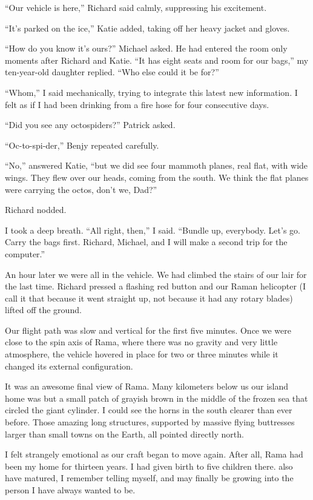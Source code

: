 \documentclass[]{article}
\begin{document}
{“Our vehicle is here,” Richard said calmly, suppressing his excitement.

“It’s parked on the ice,” Katie added, taking off her heavy jacket and gloves.

“How do you know it’s ours?” Michael asked.  He had entered the room only moments after Richard and Katie.  “It has eight seats and room for our bags,” my ten-year-old daughter replied.  “Who else could it be for?”

“Whom,” I said mechanically, trying to integrate this latest new information.  I felt as if I had been drinking from a fire hose for four consecutive days.

“Did you see any octospiders?” Patrick asked.

“Oc-to-spi-der,” Benjy repeated carefully.

“No,” answered Katie, “but we did see four mammoth planes, real flat, with wide wings.  They flew over our heads, coming from the south.  We think the flat planes were carrying the octos, don’t we, Dad?”

Richard nodded.

I took a deep breath.  “All right, then,” I said.  “Bundle up, everybody.  Let’s go.  Carry the bags first.  Richard, Michael, and I will make a second trip for the computer.”

An hour later we were all in the vehicle.  We had climbed the stairs of our lair for the last time.  Richard pressed a flashing red button and our Raman helicopter (I call it that because it went straight up, not because it had any rotary blades) lifted off the ground.

Our flight path was slow and vertical for the first five minutes.  Once we were close to the spin axis of Rama, where there was no gravity and very little atmosphere, the vehicle hovered in place for two or three minutes while it changed its external configuration.

It was an awesome final view of Rama.  Many kilometers below us our island home was but a small patch of grayish brown in the middle of the frozen sea that circled the giant cylinder.  I could see the horns in the south clearer than ever before.  Those amazing long structures, supported by massive flying buttresses larger than small towns on the Earth, all pointed directly north.

I felt strangely emotional as our craft began to move again.  After all, Rama had been my home for thirteen years.  I had given birth to five children there.  also have matured, I remember telling myself, and may finally be growing into the person I have always wanted to be.

}
\end{document}
